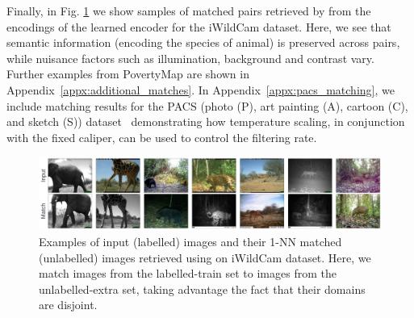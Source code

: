 Finally, in Fig. \ref{fig:matches_examples} we show samples of matched pairs retrieved by \CNN{}
from the encodings of the learned encoder for the iWildCam dataset.
%
Here, we see that semantic information (encoding the species of animal) is preserved across pairs,
while nuisance factors such as illumination, background and contrast vary.
%
Further examples from PovertyMap are shown in Appendix~\ref{appx:additional_matches}. 
%
In Appendix~\ref{appx:pacs_matching}, we include matching results for the PACS (photo (P), art
painting (A), cartoon (C), and sketch (S)) dataset~\cite{li2017deeper} demonstrating how
temperature scaling, in conjunction with the fixed caliper, can be used to control the filtering
rate.

\begin{figure}[tbp]
  \centering
  \includegraphics[width=1.\textwidth]{figures/matches_examples_2.pdf}
  \caption{
    Examples of input (labelled) images and their 1-NN matched (unlabelled) images retrieved using
    \CNN{} on iWildCam dataset. 
    Here, we match images from the labelled-train set to images from the unlabelled-extra set,
    taking advantage the fact that their domains are disjoint.
  }
  \label{fig:matches_examples}
\end{figure}
